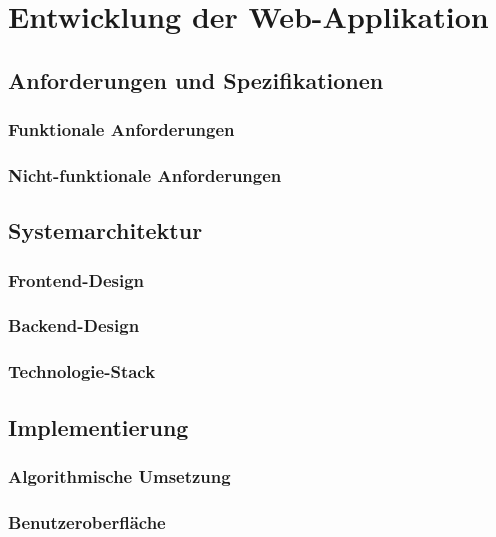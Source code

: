 \newpage
\section{Entwicklung der Web-Applikation}
\subsection{Anforderungen und Spezifikationen}
\subsubsection{Funktionale Anforderungen}
\subsubsection{Nicht-funktionale Anforderungen}
\subsection{Systemarchitektur}
\subsubsection{Frontend-Design}
\subsubsection{Backend-Design}
\subsubsection{Technologie-Stack}
\subsection{Implementierung}
\subsubsection{Algorithmische Umsetzung}
\subsubsection{Benutzeroberfläche}